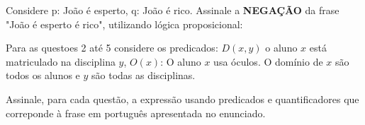 \documentclass[16pt]{examdesign}
\begin{document}
 
 
\begin{multiplechoice}[title={Questões de múltipla escolha (3 pontos cada) },rearrange=no, resetcounter=no,suppressprefix,examcolumns=2,keycolumns=2]
%  

  \begin{question}
	Considere p: João é esperto, q: João é rico. Assinale a  \textbf{NEGAÇÃO} da frase "João é esperto  é rico", utilizando 
	lógica proposicional: 

	
		
  \end{question}
 \begin{block}
 Para as questoes  2 até 5 considere os predicados:  $D(x,y)$  o aluno $x$ está matriculado na disciplina $y$, $O(x)$: O aluno $x$ usa óculos. 
 O domínio de $x$ são todos os alunos e $y$ são todas as disciplinas.
    
    Assinale, para cada questão, a expressão usando predicados e quantificadores que correponde à frase em português apresentada no enunciado. 
	\begin{question}
	    \newcommand{\FE}{$\exists x (O(x) \to D(x,\text{Cálculo}))$}
	    \newcommand{\VE}{$\exists x (O(x) \land D(x,\text{Cálculo}))$}
	    \newcommand{\VA}{$\forall x (O(x) \to D(x,\text{Cálculo}))$}
	    \newcommand{\FA}{$\forall x (O(x) \land D(x,\text{Cálculo}))$}
	    

\end{question}
\end{block}
\end{multiplechoice}
\end{document}
